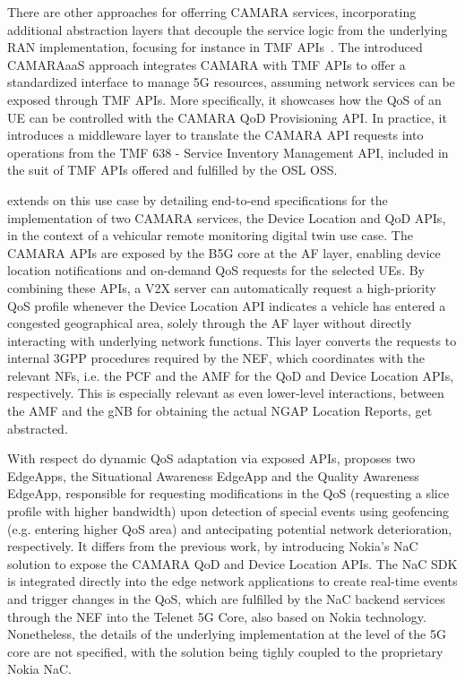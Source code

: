 There are other approaches for offerring CAMARA services, incorporating additional abstraction layers that decouple the service logic from the underlying \acs{RAN} implementation, focusing for instance in \acs{TMF} \acsp{API}~\cite{CAMARAaaSdemo}. The introduced \acs{CAMARAaaS} approach integrates CAMARA with \acs{TMF} \acsp{API} to offer a standardized interface to manage \acs{5G} resources, assuming network services can be exposed through \acs{TMF} \acsp{API}. More specifically, it showcases how the \acs{QoS} of an \acs{UE} can be controlled with the CAMARA \acs{QoD} Provisioning \acs{API}. In practice, it introduces a middleware layer to translate the CAMARA \acs{API} requests into operations from the \acs{TMF} 638 - Service Inventory Management \acs{API}, included in the suit of \acs{TMF} \acsp{API} offered and fulfilled by the \acs{OSL} \acs{OSS}. 

\citet{DynamicQoSAdaptationviaExposedServiceAPIs} extends on this use case by detailing end-to-end specifications for the implementation of two CAMARA services, the Device Location and \acs{QoD} \acsp{API}, in the context of a vehicular remote monitoring digital twin use case. The CAMARA \acsp{API} are exposed by the \acs{B5G} core at the \acs{AF} layer, enabling device location notifications and on-demand \acs{QoS} requests for the selected \acsp{UE}. By combining these \acsp{API}, a \acs{V2X} server can automatically request a high-priority \acs{QoS} profile whenever the Device Location \acs{API} indicates a vehicle has entered a congested geographical area, solely through the \acs{AF} layer without directly interacting with underlying network functions. This layer converts the requests to internal \acs{3GPP} procedures required by the \acs{NEF}, which coordinates with the relevant \acsp{NF}, i.e. the \acs{PCF} and the \acs{AMF} for the \acs{QoD} and Device Location \acsp{API}, respectively. This is especially relevant as even lower-level interactions, between the \acs{AMF} and the \acs{gNB} for obtaining the actual \acs{NGAP} Location Reports, get abstracted.

With respect do dynamic \acs{QoS} adaptation via exposed \acsp{API}, \cite{NextGenConnectivityDynamicQoS} proposes two EdgeApps, the Situational Awareness EdgeApp and the Quality Awareness EdgeApp, responsible for requesting modifications in the \acs{QoS} (requesting a slice profile with higher bandwidth) upon detection of special events using geofencing (e.g. entering higher \acs{QoS} area) and antecipating potential network deterioration, respectively. It differs from the previous work, by introducing Nokia's \acf{NaC} solution to expose the CAMARA \acs{QoD} and Device Location \acsp{API}. The \acs{NaC} \acs{SDK} is integrated directly into the edge network applications to create real-time events and trigger changes in the \acs{QoS}, which are fulfilled by the \acs{NaC} backend services through the \acs{NEF} into the Telenet \acs{5G} Core, also based on Nokia technology. Nonetheless, the details of the underlying implementation at the level of the \acs{5G} core are not specified, with the solution being tighly coupled to the proprietary Nokia \acs{NaC}.

